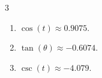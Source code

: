 \documentclass{ximera}
\begin{document}
\begin{multicols}{3}

\begin{enumerate}
\setcounter{enumi}{\value{HW}}

\item  $\cos(t) \approx 0.9075$.  

\item $\tan(\theta) \approx - 0.6074$.  

\item  $\csc(t) \approx -4.079$.  

\setcounter{HW}{\value{enumi}}

\end{enumerate}

\end{multicols}
\end{document}
